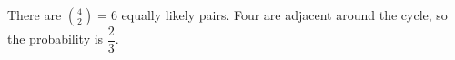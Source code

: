 There are $\binom42=6$ equally likely pairs. Four are adjacent around the cycle, so the probability is $\boxed{\dfrac{2}{3}}$.
